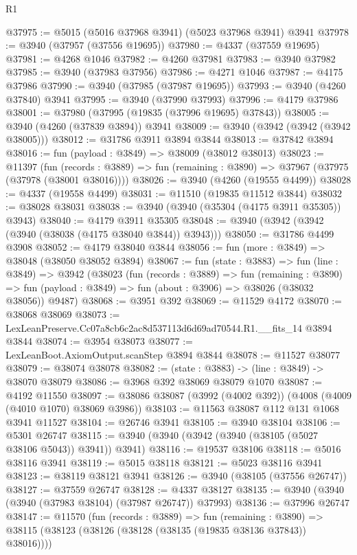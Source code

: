 \begin{lexlean}{R1}
\begin{coremodule}
@37975 := @5015 (@5016 @37968 @3941) (@5023 @37968 @3941) @3941
@37978 := @3940 (@37957 (@37556 @19695))
@37980 := @4337 (@37559 @19695)
@37981 := @4268 @1046
@37982 := @4260 @37981
@37983 := @3940 @37982
@37985 := @3940 (@37983 @37956)
@37986 := @4271 @1046
@37987 := @4175 @37986
@37990 := @3940 (@37985 (@37987 @19695))
@37993 := @3940 (@4260 @37840) @3941
@37995 := @3940 (@37990 @37993)
@37996 := @4179 @37986
@38001 := @37980 (@37995 (@19835 (@37996 @19695) @37843))
@38005 := @3940 (@4260 (@37839 @3894)) @3941
@38009 := @3940 (@3942 (@3942 (@3942 @38005)))
@38012 := @31786 @3911 @3894 @3844
@38013 := @37842 @3894
@38016 := fun (payload : @3849) => @38009 (@38012 @38013)
@38023 := @11397
    (fun (records : @3889) => fun (remaining : @3890) => @37967 (@37975 (@37978 (@38001 @38016))))
@38026 := @3940 (@4260 (@19555 @4499))
@38028 := @4337 (@19558 @4499)
@38031 := @11510 (@19835 @11512 @3844)
@38032 := @38028 @38031
@38038 := @3940 (@3940 (@35304 (@4175 @3911 @35305)) @3943)
@38040 := @4179 @3911 @35305
@38048 := @3940 (@3942 (@3942 (@3940 (@38038 (@4175 @38040 @3844)) @3943)))
@38050 := @31786 @4499 @3908
@38052 := @4179 @38040 @3844
@38056 := fun (more : @3849) => @38048 (@38050 @38052 @3894)
@38067 := fun (state : @3883) =>
  fun (line : @3849) =>
  @3942
    (@38023
      (fun (records : @3889) =>
      fun (remaining : @3890) =>
      fun (payload : @3849) => fun (about : @3906) => @38026 (@38032 @38056))
      @9487)
@38068 := @3951 @392
@38069 := @11529 @4172
@38070 := @38068 @38069
@38073 := LexLeanPreserve.Cc07a8cb6c2ac8d537113d6d69ad70544.R1.__fits_14 @3894 @3844
@38074 := @3954 @38073
@38077 := LexLeanBoot.AxiomOutput.scanStep @3894 @3844
@38078 := @11527 @38077
@38079 := @38074 @38078
@38082 := (state : @3883) -> (line : @3849) -> @38070 @38079
@38086 := @3968 @392 @38069 @38079 @1070
@38087 := @4192 @11550
@38097 := @38086 @38087 (@3992 (@4002 @392)) (@4008 (@4009 (@4010 @1070) @38069 @3986))
@38103 := @11563 @38087 @112 @131 @1068 @3941 @11527
@38104 := @26746 @3941
@38105 := @3940 @38104
@38106 := @5301 @26747
@38115 := @3940 (@3940 (@3942 (@3940 (@38105 (@5027 @38106 @5043)) @3941)) @3941)
@38116 := @19537 @38106
@38118 := @5016 @38116 @3941
@38119 := @5015 @38118
@38121 := @5023 @38116 @3941
@38123 := @38119 @38121 @3941
@38126 := @3940 (@38105 (@37556 @26747))
@38127 := @37559 @26747
@38128 := @4337 @38127
@38135 := @3940 (@3940 (@3940 (@37983 @38104) (@37987 @26747)) @37993)
@38136 := @37996 @26747
@38147 := @11570
    (fun (records : @3889) =>
    fun (remaining : @3890) =>
    @38115 (@38123 (@38126 (@38128 (@38135 (@19835 @38136 @37843)) @38016))))

\end{coremodule}
\end{lexlean}
